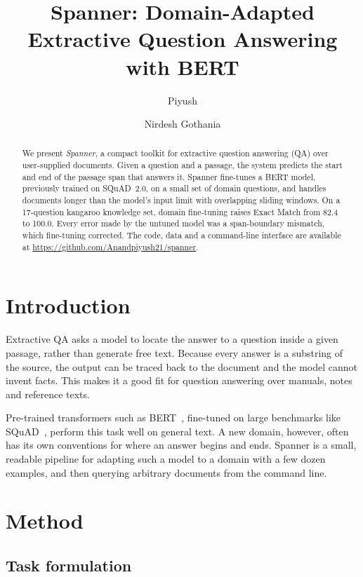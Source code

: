 \documentclass[11pt,a4paper]{article}
\title{\textbf{Spanner}: Domain-Adapted Extractive Question Answering with BERT}
\author{Piyush \and Nirdesh Gothania}
\date{}
\begin{document}
\maketitle

\begin{abstract}
We present \emph{Spanner}, a compact toolkit for extractive question answering (QA) over user-supplied documents. Given a question and a passage, the system predicts the start and end of the passage span that answers it. Spanner fine-tunes a BERT model, previously trained on SQuAD~2.0, on a small set of domain questions, and handles documents longer than the model's input limit with overlapping sliding windows. On a 17-question kangaroo knowledge set, domain fine-tuning raises Exact Match from 82.4 to 100.0. Every error made by the untuned model was a span-boundary mismatch, which fine-tuning corrected. The code, data and a command-line interface are available at \url{https://github.com/Anandpiyush21/spanner}.
\end{abstract}

\section{Introduction}

Extractive QA asks a model to locate the answer to a question inside a given passage, rather than generate free text. Because every answer is a substring of the source, the output can be traced back to the document and the model cannot invent facts. This makes it a good fit for question answering over manuals, notes and reference texts.

Pre-trained transformers such as BERT~\cite{devlin2019bert}, fine-tuned on large benchmarks like SQuAD~\cite{rajpurkar2016squad,rajpurkar2018know}, perform this task well on general text. A new domain, however, often has its own conventions for where an answer begins and ends. Spanner is a small, readable pipeline for adapting such a model to a domain with a few dozen examples, and then querying arbitrary documents from the command line.

\section{Method}

\subsection{Task formulation}
\end{document}
